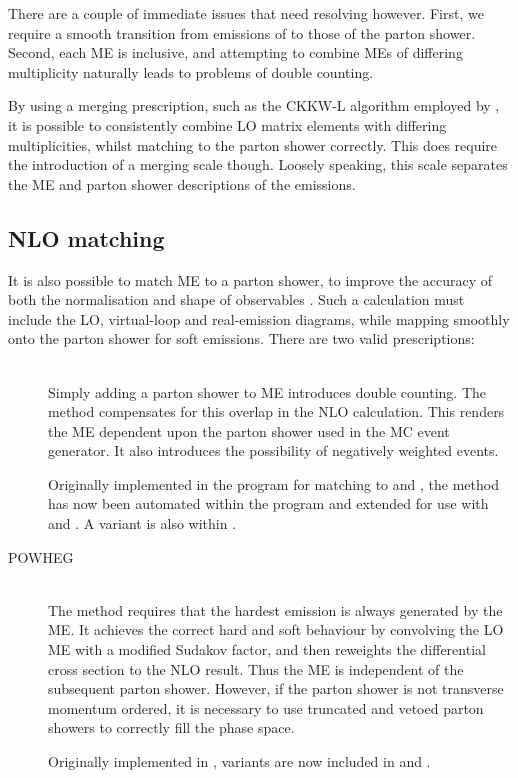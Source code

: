There are a couple of immediate issues that need resolving however. First, we require a 
smooth transition from emissions of  to those of the parton shower. Second, each 
\ac{ME} is inclusive, and attempting to combine \acp{ME} of differing multiplicity 
naturally leads to problems of double counting.

By using a merging prescription, such as the CKKW-L algorithm \cite{CKKW,Lonnblad:2002} 
employed by \sherpa, it is possible to consistently combine \ac{LO} matrix elements 
with differing multiplicities, whilst matching to the parton shower correctly. This does 
require the introduction of a merging scale though. Loosely speaking, this scale separates
the \ac{ME} and parton shower descriptions of the emissions.



\subsection{NLO matching}
\label{sec:mc:matching}

It is also possible to match  \ac{ME} to a parton shower, to improve the accuracy
of both the normalisation and shape of observables \cite{Nason:2012}. Such a calculation 
must include the \ac{LO}, virtual-loop and real-emission diagrams, while mapping smoothly 
onto the parton shower for soft emissions. There are two valid prescriptions:

\begin{description}
\item[\mcatnlo] \hfill \\
	Simply adding a parton shower to  \ac{ME} introduces double counting. The 
	\mcatnlo method compensates for this overlap in the \ac{NLO} calculation. This 
	renders the \ac{ME} dependent upon the parton shower used in the \ac{MC} event 
	generator. It also introduces the possibility of negatively weighted events.

	Originally implemented in the program \mcatnlo for matching to \fherwig 
	\cite{MCatNLO-Herwig} and \herwigpp \cite{MCatNLO-Herwig++}, the method has now been 
	automated within the \amcatnlo program and extended for use with  and 
	 \cite{aMCatNLO,MCatNLO-Pythia}. A variant is also within \sherpa.
\item[POWHEG] \hfill \\
	The \powheg method requires that the hardest emission is always generated by the 
	\ac{ME}. It achieves the correct hard and soft behaviour by convolving the \ac{LO} 
	\ac{ME} with a modified Sudakov factor, and then reweights the differential cross 
	section to the \ac{NLO} result. Thus the \ac{ME} is independent of the subsequent 
	parton shower. However, if the parton shower is not transverse momentum ordered, it is
	necessary to use truncated and vetoed parton showers to correctly fill the phase 
	space.

	Originally implemented in \powhegbox \cite{Powheg-method,Powheg-method2,PowhegBox}, 
	variants are now included in \herwigpp and \sherpa.
\end{description}



